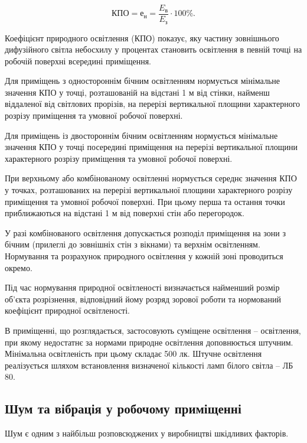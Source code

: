 \begin{equation}\label{eq:kpo}
\text{КПО} = \text{е}_{\text{н}} = \frac{E_{\text{в}}}{E_{\text{з}}} \cdot 100 \%.
\end{equation}

Коефіцієнт природного освітлення (КПО) показує, яку частину зовнішнього дифузійного світла небосхилу у процентах становить освітлення в певній точці на робочій поверхні всередині приміщення.

Для приміщень з одностороннім бічним освітленням нормується мінімальне значення КПО у точці, розташованій на відстані 1 м від стінки, найменш віддаленої від світлових прорізів, на перерізі вертикальної площини характерного розрізу приміщення та умовної робочої поверхні.

Для приміщень із двостороннім бічним освітленням нормується мінімальне значення КПО у точці посередині приміщення на перерізі вертикальної площини характерного розрізу приміщення та умовної робочої поверхні.

При верхньому або комбінованому освітленні нормується середнє значення КПО у точках, розташованих на перерізі вертикальної площини характерного розрізу приміщення та умовної робочої поверхні. При цьому перша та остання точки приближаються на відстані 1 м від поверхні стін або перегородок.

У разі комбінованого освітлення допускається розподіл приміщення на зони з бічним (прилеглі до зовнішніх стін з вікнами) та верхнім освітленням. Нормування та розрахунок природного освітлення у кожній зоні проводиться окремо.

Під час нормування природної освітленості визначається найменший розмір об’єкта розрізнення, відповідний йому розряд зорової роботи та нормований коефіцієнт природної освітленості.

В приміщенні, що розглядається, застосовують суміщене освітлення $–$ освітлення, при якому недостатнє за нормами природне освітлення доповнюється штучним. Мінімальна освітленість при цьому складає 500 лк. Штучне освітлення реалізується шляхом встановлення визначеної кількості ламп білого світла – ЛБ 80.

\newpage

\subsection{Шум та вібрація у робочому приміщенні}

Шум є одним з найбільш розповсюджених у виробництві шкідливих факторів. 

